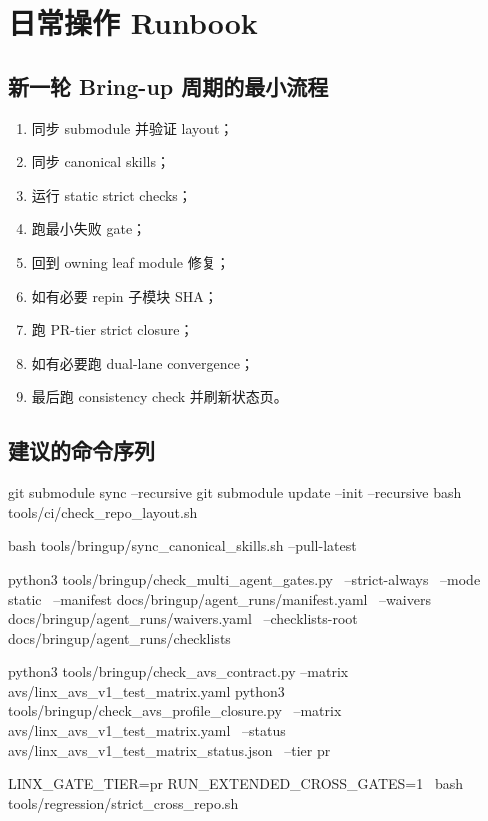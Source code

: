 \documentclass[UTF8,11pt,a4paper]{ctexart}
\begin{document}
\section{日常操作 Runbook}

\subsection{新一轮 Bring-up 周期的最小流程}

\begin{enumerate}
  \item 同步 submodule 并验证 layout；
  \item 同步 canonical skills；
  \item 运行 static strict checks；
  \item 跑最小失败 gate；
  \item 回到 owning leaf module 修复；
  \item 如有必要 repin 子模块 SHA；
  \item 跑 PR-tier strict closure；
  \item 如有必要跑 dual-lane convergence；
  \item 最后跑 consistency check 并刷新状态页。
\end{enumerate}

\subsection{建议的命令序列}

\begin{CodeBlock}
git submodule sync --recursive
git submodule update --init --recursive
bash tools/ci/check_repo_layout.sh

bash tools/bringup/sync_canonical_skills.sh --pull-latest

python3 tools/bringup/check_multi_agent_gates.py \
  --strict-always \
  --mode static \
  --manifest docs/bringup/agent_runs/manifest.yaml \
  --waivers docs/bringup/agent_runs/waivers.yaml \
  --checklists-root docs/bringup/agent_runs/checklists

python3 tools/bringup/check_avs_contract.py --matrix avs/linx_avs_v1_test_matrix.yaml
python3 tools/bringup/check_avs_profile_closure.py \
  --matrix avs/linx_avs_v1_test_matrix.yaml \
  --status avs/linx_avs_v1_test_matrix_status.json \
  --tier pr

LINX_GATE_TIER=pr RUN_EXTENDED_CROSS_GATES=1 \
bash tools/regression/strict_cross_repo.sh
\end{CodeBlock}
\end{document}
